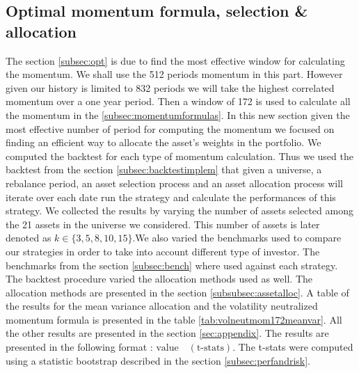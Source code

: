 \documentclass{article}
\begin{document}
\subsection{Optimal momentum formula, selection \& allocation}\label{subsec:optimomFSA}
The section \ref{subsec:opt} is due to find the most effective window for calculating the momentum. We shall use the 512 periods momentum in this part. However given our history is limited to 832 periods we will take the highest correlated momentum over a one year period. Then a window of 172 is used to calculate all the momentum in the \ref{subsec:momentumformulas}. In this new section given the most effective number of period for computing the momentum we focused on finding an efficient way to allocate the asset's weights in the portfolio. We computed the backtest for each type of momentum calculation. Thus we used the backtest from the section \ref{subsec:backtestimplem} that given a universe, a rebalance period, an asset selection process and an asset allocation process will iterate over each date run the strategy and calculate the performances of this strategy.\newline\newline
We collected the results by varying the number of assets selected among the 21 assets in the universe we considered. This number of assets is later denoted as $k \in\{3, 5, 8, 10, 15\}$.\newline We also varied the benchmarks used to compare our strategies in order to take into account different type of investor. The benchmarks from the section \ref{subsec:bench} where used against each strategy.\newline
The backtest procedure varied the allocation methods used as well. The allocation methods are presented in the section \ref{subsubsec:assetalloc}.
A table of the results for the mean variance allocation and the volatility neutralized momentum formula is presented in the table \ref{tab:volneutmom172meanvar}. All the other results are presented in the section \ref{sec:appendix}. The results are presented in the following format : $\text{value}\quad(\text{t-stats})$. The t-stats were computed using a statistic bootstrap described in the section \ref{subsec:perfandrisk}.
\end{document}
